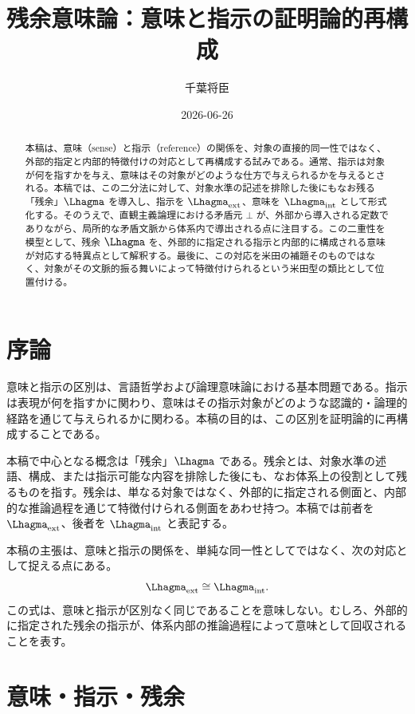 \documentclass[11pt,a4paper]{article}
\newcommand{\lext}{\Lhagma_{\mathrm{ext}}}
\newcommand{\lint}{\Lhagma_{\mathrm{int}}}
\theoremstyle{definition}
\begin{document}
\title{残余意味論：意味と指示の証明論的再構成}
\author{千葉将臣}
\date{2026-06-26}
\maketitle

\begin{abstract}
本稿は、意味（sense）と指示（reference）の関係を、対象の直接的同一性ではなく、外部的指定と内部的特徴付けの対応として再構成する試みである。通常、指示は対象が何を指すかを与え、意味はその対象がどのような仕方で与えられるかを与えるとされる。本稿では、この二分法に対して、対象水準の記述を排除した後にもなお残る「残余」$\Lhagma$ を導入し、指示を $\lext$、意味を $\lint$ として形式化する。そのうえで、直観主義論理における矛盾元 $\bot$ が、外部から導入される定数でありながら、局所的な矛盾文脈から体系内で導出される点に注目する。この二重性を模型として、残余 $\Lhagma$ を、外部的に指定される指示と内部的に構成される意味が対応する特異点として解釈する。最後に、この対応を米田の補題そのものではなく、対象がその文脈的振る舞いによって特徴付けられるという米田型の類比として位置付ける。
\end{abstract}

\section{序論}

意味と指示の区別は、言語哲学および論理意味論における基本問題である。指示は表現が何を指すかに関わり、意味はその指示対象がどのような認識的・論理的経路を通じて与えられるかに関わる。本稿の目的は、この区別を証明論的に再構成することである。

本稿で中心となる概念は「残余」$\Lhagma$ である。残余とは、対象水準の述語、構成、または指示可能な内容を排除した後にも、なお体系上の役割として残るものを指す。残余は、単なる対象ではなく、外部的に指定される側面と、内部的な推論過程を通じて特徴付けられる側面をあわせ持つ。本稿では前者を $\lext$、後者を $\lint$ と表記する。

本稿の主張は、意味と指示の関係を、単純な同一性としてではなく、次の対応として捉える点にある。
\[
\lext \cong \lint .
\]
この式は、意味と指示が区別なく同じであることを意味しない。むしろ、外部的に指定された残余の指示が、体系内部の推論過程によって意味として回収されることを表す。

\section{意味・指示・残余}
\end{document}
